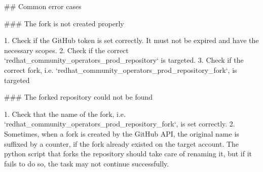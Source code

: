 ## Common error cases

### The fork is not created properly

1. Check if the GitHub token is set correctly. It must not be expired and have the necessary scopes.
2. Check if the correct `redhat_community_operators_prod_repository` is targeted.
3. Check if the correct fork, i.e. `redhat_community_operators_prod_repository_fork`, is targeted

### The forked repository could not be found

1. Check that the name of the fork, i.e. `redhat_community_operators_prod_repository_fork`, is set correctly.
2. Sometimes, when a fork is created by the GitHub API, the original name is suffixed by a counter, if the fork already existed on the target account.
   The python script that forks the repository should take care of renaming it, but if it fails to do so, the task may not continue successfully.
